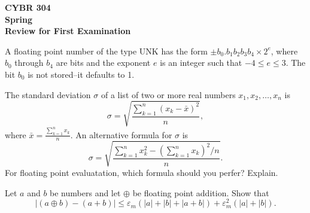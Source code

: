 \documentclass[12pt,fleqn]{exam}
\begin{document}
\begin{flushleft}


{\bf
  CYBR 304 \\
   Spring \the\year\\
  Review for First Examination
}
\end{flushleft}


\begin{questions}


\question  A floating point number of the type UNK has the form $\pm b_0.b_1 b_2 b_3 b_4 \times 2^e$, where
$b_0$ through $b_4$ are bits and the exponent $e$ is an integer such that $-4 \leq e \leq 3$.  The bit $b_0$ is
not stored--it defaults to 1.


 \question [5] The standard deviation \(\sigma\) of a list of two or more real numbers \(x_1, x_2, \dots, x_n\) is 
\[
   \sigma = \sqrt{\frac{\sum_{k=1}^n (x_k - \bar x)^2}{n}},
\]
where 
\(
 \bar x = \frac{\sum_{k=1}^n x_k }{n}.
\)
An alternative formula for \(\sigma\) is 
\[
   \sigma = \sqrt{\frac{\sum_{k=1}^n x_k^2  -  \left(\sum_{k=1}^n  x_k \right)^2/n}{n}}.
\]
For floating point evaluatation, which formula should you perfer?  Explain.
\begin{solution}%

\end{solution}


 \question[5]  Let \(a\) and \(b\) be  numbers and let \(\oplus\) be floating point addition.  Show that
\[
     \left|  (a  \oplus b)  - (a + b)   \right|  \leq \varepsilon_m  \left ( |a| + |b|  + \left |a + b \right|  \right)  +  \varepsilon_m^2 (| a|  + |b| ).
 \]

\begin{solution}%

\end{solution}



\end{questions}
\end{document}
